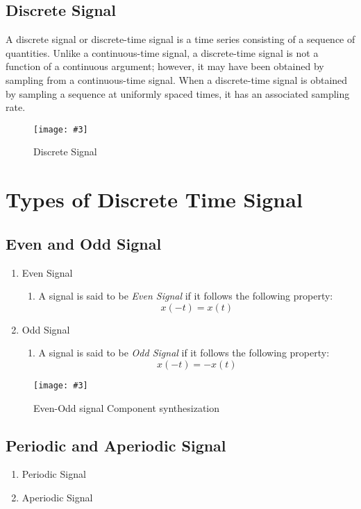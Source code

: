 \documentclass{article}
\newcommand{\addImage}[5]{
    \begin{figure}[#1]
        \centering
        \texttt{[image: \#3]}
        \caption{#4}
        \label{fig:#5}
    \end{figure}
}
\begin{document}
\begin{multicols}{2}
        \subsection{Discrete Signal}
        A discrete signal or discrete-time signal is a time series consisting 
        of a sequence of quantities. Unlike a continuous-time signal, a 
        discrete-time signal is not a function of a continuous argument; 
        however, it may have been obtained by sampling from a continuous-time 
        signal. When a discrete-time signal is obtained by sampling a sequence 
        at uniformly spaced times, it has an associated sampling rate.
        \cite{wikiDiscrete}
        \addImage{H}{7cm}{discreteSignal.png}{Discrete Signal \cite{wikiDiscrete}}{discrete signal}

    \section{Types of Discrete Time Signal}
        \subsection{Even and Odd Signal}
            \begin{enumerate}
                \item Even Signal
                \begin{enumerate}
                    \item[] A signal is said to be \textit{Even Signal} if it follows the following property: \newline $$x(-t) = x(t)$$
                \end{enumerate}
                \item Odd Signal
                \begin{enumerate}
                    \item[] A signal is said to be \textit{Odd Signal} if it follows the following property: \newline $$x(-t) = -x(t)$$
                \end{enumerate}
            \end{enumerate}
        \addImage{H}{8cm}{evenOdd.png}{Even-Odd signal Component synthesization\cite{evenOddImage}}{evenodd-signal}
        \subsection{Periodic and Aperiodic Signal}
            \begin{enumerate}
                \item Periodic Signal
                \item Aperiodic Signal
            \end{enumerate}


\end{multicols}
\end{document}
